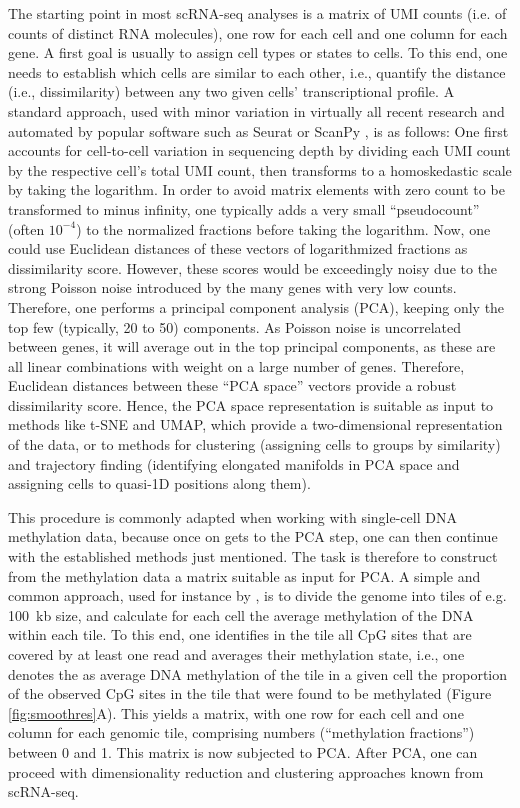 \documentclass[twocolumn,10pt]{article}
\begin{document}
The starting point in most scRNA-seq analyses is a matrix of UMI counts (i.e.
of counts of distinct RNA molecules), one row for each cell and one column for each gene.
A first goal is usually to assign cell types or states to cells.
To this end, one needs to establish which cells are similar to each other, i.e., quantify the distance (i.e., dissimilarity) between any two given cells' transcriptional profile.
A standard approach, used with minor variation in virtually all recent research and automated by popular software such as Seurat \citep{Hao_2021} or ScanPy \citep{Wolf_2018}, is as follows: One first accounts for cell-to-cell variation in sequencing depth by dividing each UMI count by the respective cell's total UMI count, then transforms to a homoskedastic scale by taking the logarithm.
In order to avoid matrix elements with zero count to be transformed to minus infinity, one typically adds a very small ``pseudocount'' (often $10^{-4}$) to the normalized fractions before taking the logarithm.
Now, one could use Euclidean distances of these vectors of logarithmized fractions as dissimilarity score.
However, these scores would be exceedingly noisy due to the strong Poisson noise introduced by the many genes with very low counts.
Therefore, one performs a principal component analysis (PCA), keeping only the top few (typically, 20 to 50) components.
As Poisson noise is uncorrelated between genes, it will average out in the top principal components, as these are all linear combinations with weight on a large number of genes.
Therefore, Euclidean distances between these ``PCA space'' vectors provide a robust dissimilarity score.
Hence, the PCA space representation is suitable as input to methods like t-SNE and UMAP, which provide a two-dimensional representation of the data, or to methods for clustering (assigning cells to groups by similarity) and trajectory finding (identifying elongated manifolds in PCA space and assigning cells to quasi-1D positions along them).

This procedure is commonly adapted when working with single-cell DNA methylation data, because once on gets to the PCA step, one can then continue with the established methods just mentioned. The task is therefore to construct from the methylation data a matrix suitable as input for PCA.
A simple and common approach, used for instance by \citet{luo2017single}, is to divide the genome into tiles of e.g. 100~kb size, and calculate for each cell the average methylation of the DNA within each tile.
To this end, one identifies in the tile all CpG sites that are covered by at least one read and averages their methylation state, i.e., one denotes the as average DNA methylation of the tile in a given cell the proportion of the observed CpG sites in the tile that were found to be methylated (Figure \ref{fig:smoothres}A).
This yields a matrix, with one row for each cell and one column for each genomic tile, comprising numbers (``methylation fractions'') between 0 and 1.
This matrix is now subjected to PCA.
After PCA, one can proceed with dimensionality reduction and clustering approaches known from scRNA-seq.
\end{document}

